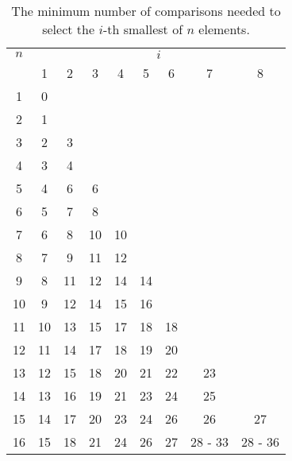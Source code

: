 \documentclass[twoside,leqno,twocolumn]{article}
\begin{document}
\begin{table}[!t]
  \renewcommand{\arraystretch}{1.2}
  \caption{The minimum number of comparisons needed to select the $i$-th smallest of $n$ elements.}
  \label{table:num-comparisons}
  \centering
  \begin{tabular}{c|cccccccc}
    $n$ & \multicolumn{8}{c}{$i$}                                              \\
        & 1                       & 2  & 3  & 4  & 5  & 6  & 7       & 8       \\ \hline
    1   & 0                                                                    \\
    2   & 1                                                                    \\
    3   & 2                       & 3                                          \\
    4   & 3                       & 4                                          \\
    5   & 4                       & 6  & 6                                     \\
    6   & 5                       & 7  & 8                                     \\
    7   & 6                       & 8  & 10 & 10                               \\
    8   & 7                       & 9  & 11 & 12                               \\
    9   & 8                       & 11 & 12 & 14 & 14                          \\
    10  & 9                       & 12 & 14 & 15 & 16                          \\
    11  & 10                      & 13 & 15 & 17 & 18 & 18                     \\
    12  & 11                      & 14 & 17 & 18 & 19 & 20                     \\
    13  & 12                      & 15 & 18 & 20 & 21 & 22 & 23                \\
    14  & 13                      & 16 & 19 & 21 & 23 & 24 & 25                \\
    15  & 14                      & 17 & 20 & 23 & 24 & 26 & 26      & 27      \\
    16  & 15                      & 18 & 21 & 24 & 26 & 27 & 28 - 33 & 28 - 36 \\
  \end{tabular}
\end{table}
\end{document}
